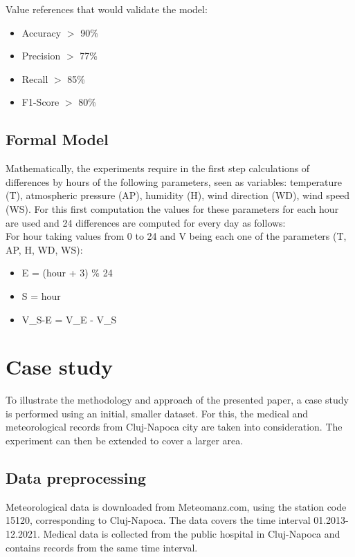 \documentclass{article}
\begin{document}
Value references that would validate the model:
\begin{itemize}
    \item Accuracy $>$ 90\%
    \item Precision $>$ 77\%
    \item Recall $>$ 85\%
    \item F1-Score $>$ 80\%
\end{itemize}

\subsection{Formal Model}

Mathematically, the experiments require in the first step calculations of differences by hours of the following parameters, seen as variables: temperature (T), atmospheric pressure (AP), humidity (H), wind direction (WD), wind speed (WS). For this first computation the values for these parameters for each hour are used and 24 differences are computed for every day as follows: 
\\

For hour taking values from 0 to 24 and V being each one of the parameters (T, AP, H, WD, WS):
\begin{itemize}
    \item E = (hour + 3) \% 24
    \item S = hour 
    \item V\_S-E = V\_E - V\_S 
\end{itemize}

\section{Case study}

To illustrate the methodology and approach of the presented paper, a case study is performed using an initial, smaller dataset. For this, the medical and meteorological records from Cluj-Napoca city are taken into consideration. The experiment can then be extended to cover a larger area.

\subsection{Data preprocessing}

Meteorological data is downloaded from Meteomanz.com, using the station code 15120, corresponding to Cluj-Napoca. The data covers the time interval 01.2013-12.2021. Medical data is collected from the public hospital in Cluj-Napoca and contains records from the same time interval.
\\
\end{document}
